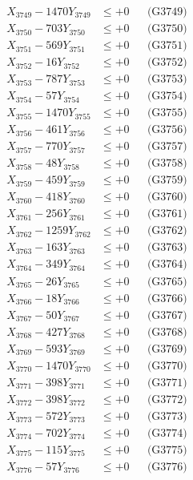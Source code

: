 \documentclass[a4paper,10pt]{article}
\begin{document}
{\begin{align}
X_{3749} - 1470Y_{3749} &\leq +0 && \text{(G3749)} \\
X_{3750} - 703Y_{3750} &\leq +0 && \text{(G3750)} \\
\allowbreak
X_{3751} - 569Y_{3751} &\leq +0 && \text{(G3751)} \\
X_{3752} - 16Y_{3752} &\leq +0 && \text{(G3752)} \\
X_{3753} - 787Y_{3753} &\leq +0 && \text{(G3753)} \\
X_{3754} - 57Y_{3754} &\leq +0 && \text{(G3754)} \\
X_{3755} - 1470Y_{3755} &\leq +0 && \text{(G3755)} \\
X_{3756} - 461Y_{3756} &\leq +0 && \text{(G3756)} \\
X_{3757} - 770Y_{3757} &\leq +0 && \text{(G3757)} \\
X_{3758} - 48Y_{3758} &\leq +0 && \text{(G3758)} \\
X_{3759} - 459Y_{3759} &\leq +0 && \text{(G3759)} \\
X_{3760} - 418Y_{3760} &\leq +0 && \text{(G3760)} \\
\allowbreak
X_{3761} - 256Y_{3761} &\leq +0 && \text{(G3761)} \\
X_{3762} - 1259Y_{3762} &\leq +0 && \text{(G3762)} \\
X_{3763} - 163Y_{3763} &\leq +0 && \text{(G3763)} \\
X_{3764} - 349Y_{3764} &\leq +0 && \text{(G3764)} \\
X_{3765} - 26Y_{3765} &\leq +0 && \text{(G3765)} \\
X_{3766} - 18Y_{3766} &\leq +0 && \text{(G3766)} \\
X_{3767} - 50Y_{3767} &\leq +0 && \text{(G3767)} \\
X_{3768} - 427Y_{3768} &\leq +0 && \text{(G3768)} \\
X_{3769} - 593Y_{3769} &\leq +0 && \text{(G3769)} \\
X_{3770} - 1470Y_{3770} &\leq +0 && \text{(G3770)} \\
\allowbreak
X_{3771} - 398Y_{3771} &\leq +0 && \text{(G3771)} \\
X_{3772} - 398Y_{3772} &\leq +0 && \text{(G3772)} \\
X_{3773} - 572Y_{3773} &\leq +0 && \text{(G3773)} \\
X_{3774} - 702Y_{3774} &\leq +0 && \text{(G3774)} \\
X_{3775} - 115Y_{3775} &\leq +0 && \text{(G3775)} \\
X_{3776} - 57Y_{3776} &\leq +0 && \text{(G3776)} \\

\end{align}}
\end{document}
